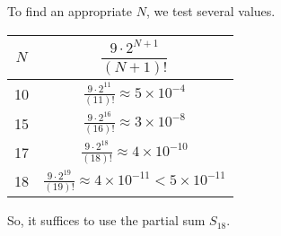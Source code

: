 \begin{solution}
	To find an appropriate $N$, we test several values.

	\begin{center}
		\begin{tabular}{|c|c|}
			\hline
			$N$&$ \dfrac{9\cdot 2^{N+1}}{(N+1)!}$\\ \hline
			10 & $\displaystyle \frac{9\cdot 2^{11}}{(11)!}\approx 5\times 10^{-4}$\\\hline
			15 & $\displaystyle \frac{9\cdot 2^{16}}{(16)!}\approx 3\times 10^{-8}$\\\hline
			17 & $\displaystyle \frac{9\cdot 2^{18}}{(18)!}\approx 4\times 10^{-10}$\\\hline
			18 & $\displaystyle \frac{9\cdot 2^{19}}{(19)!}\approx 4\times 10^{-11}<5\times10^{-11}$\\\hline
		\end{tabular}
	\end{center}
	So, it suffices to use the partial sum $S_{18}$.
\end{solution}





